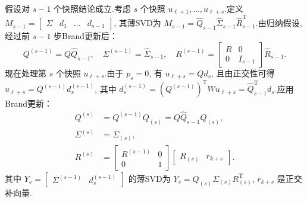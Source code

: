 假设对 $s-1$ 个快照结论成立.考虑 $s$ 个快照 $u_{\ell+1},\dots,u_{\ell+s}$.定义 $M_{s-1} = \begin{bmatrix}\Sigma & d_1 & \dots & d_{s-1}\end{bmatrix}$, 其薄SVD为 $M_{s-1} = \widehat Q_{s-1} \widehat\Sigma_{s-1} \widehat R_{s-1}^{\mathrm T}$.由归纳假设, 经过前 $s-1$ 步Brand更新后：
\begin{equation}
Q^{(s-1)} = Q \widehat Q_{s-1},\quad \Sigma^{(s-1)} = \widehat\Sigma_{s-1},\quad R^{(s-1)} = \begin{bmatrix}R & 0\\0 & I_{s-1}\end{bmatrix} \widehat R_{s-1}.
\end{equation}
现在处理第 $s$ 个快照 $u_{\ell+s}$.由于 $p_s=0$, 有 $u_{\ell+s} = Q d_s$, 且由正交性可得 $u_{\ell+s} = Q^{(s-1)} d_s^{(s-1)}$, 其中 $d_s^{(s-1)} = (Q^{(s-1)})^{\mathrm T}W u_{\ell+s} = \widehat Q_{s-1}^{\mathrm T} d_s$.应用Brand更新：
\begin{align}
Q^{(s)} &= Q^{(s-1)} Q_{(s)} = Q \widehat Q_{s-1} Q_{(s)},\\
\Sigma^{(s)} &= \Sigma_{(s)},\\
R^{(s)} &= \begin{bmatrix}R^{(s-1)} & 0\\0 & 1\end{bmatrix} \begin{bmatrix}R_{(s)} & r_{k+s}\end{bmatrix}.
\end{align}
其中 $Y_s = \begin{bmatrix}\Sigma^{(s-1)} & d_s^{(s-1)}\end{bmatrix}$ 的薄SVD为 $Y_s = Q_{(s)}\Sigma_{(s)}R_{(s)}^{\mathrm T}$, $r_{k+s}$ 是正交补向量.

